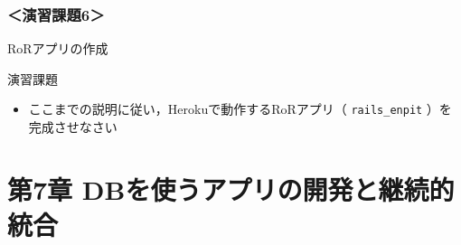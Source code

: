 \documentclass[t, aspectratio=169]{beamer}
\begin{document}
\section{＜演習課題6＞}
\label{sec-6-4}
\begin{frame}[fragile,label=sec-6-4-1]{RoRアプリの作成}
 \begin{block}{演習課題}
\begin{itemize}
\item ここまでの説明に従い，Herokuで動作するRoRアプリ（ \texttt{rails\_enpit} ）を完成させなさい
\end{itemize}
\end{block}
\end{frame}
\part{第7章 DBを使うアプリの開発と継続的統合}
\label{sec-7}
\end{document}
